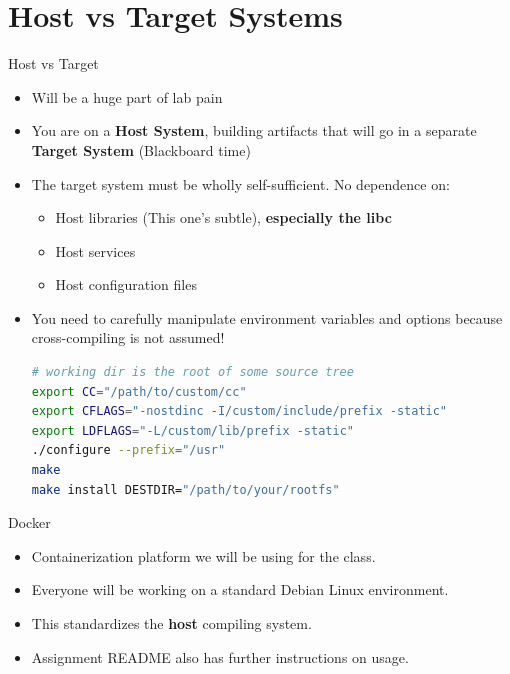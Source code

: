 \documentclass{../lecture}
\begin{document}
\section{Host vs Target Systems}

\begin{frame}[fragile]{Host vs Target}
  \begin{itemize}
    \item Will be a huge part of lab pain
    \item You are on a \textbf{Host System}, building artifacts that will go in
      a separate \textbf{Target System} (Blackboard time)
    \item The target system must be wholly self-sufficient. No dependence on:
      \begin{itemize}
        \item Host libraries (This one's subtle), \textbf{especially the libc}
        \item Host services
        \item Host configuration files
      \end{itemize}
    \item You need to carefully manipulate environment variables and options
      because cross-compiling is not assumed!
\begin{lstlisting}[language=bash]
# working dir is the root of some source tree
export CC="/path/to/custom/cc"
export CFLAGS="-nostdinc -I/custom/include/prefix -static"
export LDFLAGS="-L/custom/lib/prefix -static"
./configure --prefix="/usr"
make
make install DESTDIR="/path/to/your/rootfs"
\end{lstlisting}
  \end{itemize}
\end{frame}

\begin{frame}{Docker}
  \begin{itemize}
    \item Containerization platform we will be using for the class.
    \item Everyone will be working on a standard Debian Linux environment.
    \item This standardizes the \textbf{host} compiling system.
    \item Assignment README also has further instructions on usage.
  \end{itemize}
\end{frame}
\end{document}
